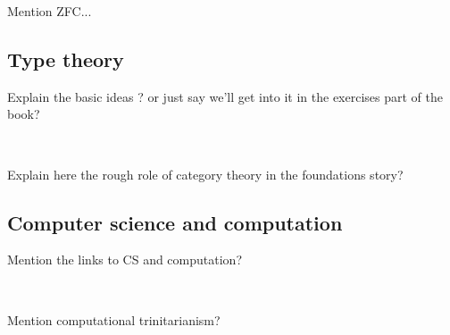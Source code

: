 Mention ZFC... 



\subsection{Type theory}


Explain the basic ideas ? or just say we'll get into it in the exercises part of the book? 

\


Explain here the rough role of category theory in the foundations story? 


\subsection{Computer science and computation}

Mention the links to CS and computation? 


\

Mention computational trinitarianism?





